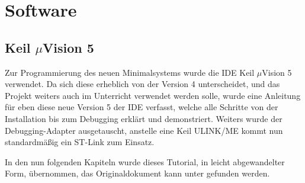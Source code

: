 \newcommand*{\uVision}{$\mu$Vision}

\clearpage
{}
\section{Software}
\label{sec:software}

\subsection{Keil \uVision{} 5}
\label{sec:uvision-5}

Zur Programmierung des neuen \gls{Minimalsystem}s wurde die \gls{IDE} Keil \uVision{} 5 verwendet. Da sich diese erheblich von der Version 4 unterscheidet, und das Projekt weiters auch im Unterricht verwendet werden solle, wurde eine Anleitung für eben diese neue Version 5 der \gls{IDE} verfasst, welche alle Schritte von der Installation bis zum \gls{Debugging} erklärt und demonstriert. Weiters wurde der \gls{Debugging}-Adapter ausgetauscht, anstelle eine \gls{Keil} ULINK/ME kommt nun standardmäßig ein ST-Link zum Einsatz.

In den nun folgenden Kapiteln wurde dieses Tutorial, in leicht abgewandelter Form, übernommen, das Originaldokument kann unter \cite{doku:tutorial} gefunden werden.



